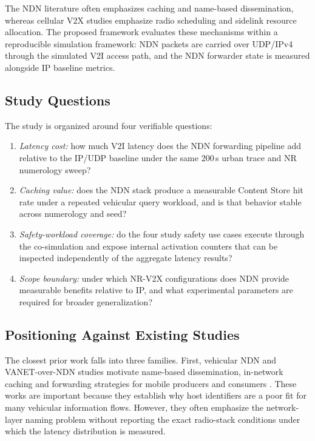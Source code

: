 \documentclass[journal]{IEEEtran}
\begin{document}
The NDN literature often emphasizes caching and name-based dissemination, whereas cellular V2X studies emphasize radio scheduling and sidelink resource allocation. The proposed framework evaluates these mechanisms within a reproducible simulation framework: NDN packets are carried over UDP/IPv4 through the simulated V2I access path, and the NDN forwarder state is measured alongside IP baseline metrics.

\subsection{Study Questions}

The study is organized around four verifiable questions:
\begin{enumerate}
  \item \emph{Latency cost:} how much V2I latency does the NDN forwarding pipeline add relative to the IP/UDP baseline under the same 200\,s urban trace and NR numerology sweep?
  \item \emph{Caching value:} does the NDN stack produce a measurable Content Store hit rate under a repeated vehicular query workload, and is that behavior stable across numerology and seed?
  \item \emph{Safety-workload coverage:} do the four study safety use cases execute through the co-simulation and expose internal activation counters that can be inspected independently of the aggregate latency results?
  \item \emph{Scope boundary:} under which NR-V2X configurations does NDN provide measurable benefits relative to IP, and what experimental parameters are required for broader generalization?
\end{enumerate}

\subsection{Positioning Against Existing Studies}

The closest prior work falls into three families. First, vehicular NDN and VANET-over-NDN studies motivate name-based dissemination, in-network caching and forwarding strategies for mobile producers and consumers \cite{ref:vndn,ref:ndn-v2x-survey,ref:ndn-mobility}. These works are important because they establish why host identifiers are a poor fit for many vehicular information flows. However, they often emphasize the network-layer naming problem without reporting the exact radio-stack conditions under which the latency distribution is measured.
\end{document}
